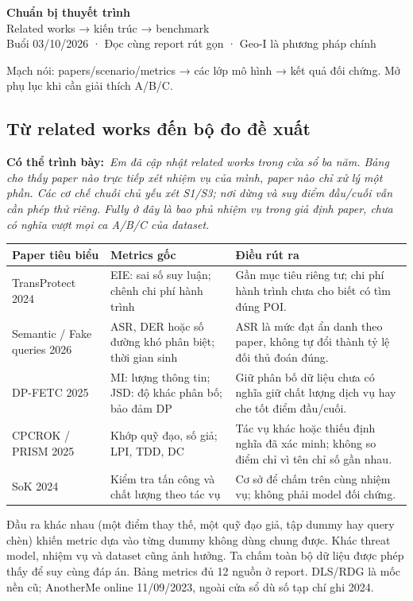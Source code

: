 \documentclass[10pt,a4paper]{article}
\newcommand{\key}[1]{\par\smallskip\noindent\colorbox{pale}{\parbox{\dimexpr\linewidth-2\fboxsep}{#1}}\par\smallskip}
\newcommand{\say}[1]{\par\textbf{Có thể trình bày:}\ \textit{#1}\par}
\begin{document}
\begin{center}
{\LARGE\bfseries\color{ink}Chuẩn bị thuyết trình}\\[5pt]
{\large Related works → kiến trúc → benchmark}\\[3pt]
{\small Buổi 03/10/2026 · Đọc cùng report rút gọn · Geo-I là phương pháp chính}
\end{center}
\key{Mạch nói: papers/scenario/metrics → các lớp mô hình → kết quả đối chứng. Mở phụ lục khi cần giải thích A/B/C.}


\clearpage\subsection{Từ related works đến bộ đo đề xuất}
\say{Em đã cập nhật related works trong cửa sổ ba năm. Bảng cho thấy paper nào trực tiếp xét nhiệm vụ của mình, paper nào chỉ xử lý một phần. Các cơ chế chuỗi chủ yếu xét S1/S3; nơi dừng và suy điểm đầu/cuối vẫn cần phép thử riêng. Fully ở đây là bao phủ nhiệm vụ trong giả định paper, chưa có nghĩa vượt mọi ca A/B/C của dataset.}

\begin{longtable}{@{}P{4.1cm}P{5.4cm}P{6.1cm}@{}}
\toprule Paper tiêu biểu & Metrics gốc & Điều rút ra\\\midrule
TransProtect 2024 & EIE: sai số suy luận; chênh chi phí hành trình & Gần mục tiêu riêng tư; chi phí hành trình chưa cho biết có tìm đúng POI.\\
Semantic / Fake queries 2026 & ASR, DER hoặc số đường khó phân biệt; thời gian sinh & ASR là mức đạt ẩn danh theo paper, không tự đổi thành tỷ lệ đối thủ đoán đúng.\\
DP-FETC 2025 & MI: lượng thông tin; JSD: độ khác phân bố; bảo đảm DP & Giữ phân bố dữ liệu chưa có nghĩa giữ chất lượng dịch vụ hay che tốt điểm đầu/cuối.\\
CPCROK / PRISM 2025 & Khớp quỹ đạo, số giả; LPI, TDD, DC & Tác vụ khác hoặc thiếu định nghĩa đã xác minh; không so điểm chỉ vì tên chỉ số gần nhau.\\
SoK 2024 & Kiểm tra tấn công và chất lượng theo tác vụ & Cơ sở để chấm trên cùng nhiệm vụ; không phải model đối chứng.\\
\bottomrule
\end{longtable}
Đầu ra khác nhau (một điểm thay thế, một quỹ đạo giả, tập dummy hay query chèn) khiến metric dựa vào từng dummy không dùng chung được. Khác threat model, nhiệm vụ và dataset cũng ảnh hưởng. Ta chấm toàn bộ dữ liệu được phép thấy để suy cùng đáp án. Bảng metrics đủ 12 nguồn ở report. DLS/RDG là mốc nền cũ; AnotherMe online 11/09/2023, ngoài cửa sổ dù số tạp chí ghi 2024.
\end{document}
